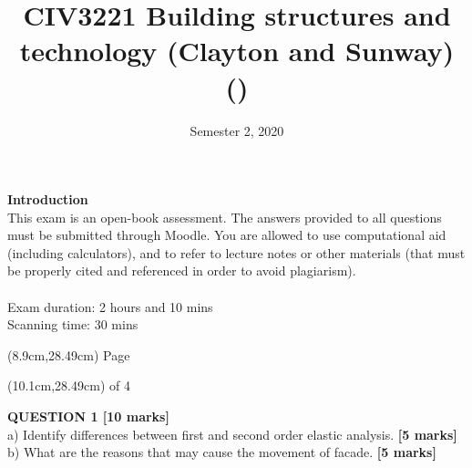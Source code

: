 \documentclass[a4paper,11pt]{article}
\title{CIV3221 Building structures and technology (Clayton and Sunway)\\
\VAR{FullName} (\VAR{StudentID})}
\date{Semester 2, 2020}
\begin{document}
\maketitle

\begin{introduction}	
\noindent
\textbf{Introduction}\\
\noindent
This exam is an open-book assessment. The answers provided to all questions must be submitted through Moodle. You are allowed to use computational aid (including calculators), and to refer to lecture notes or other materials (that must be properly cited and referenced in order to avoid plagiarism).\\
\\ 
\noindent
Exam duration: 2 hours and 10 mins\\
\noindent
Scanning time: 30 mins\\

\end{introduction}
\begin{textblock*}{5cm}(8.9cm,28.49cm)
Page
\end{textblock*}
\begin{textblock*}{5cm}(10.1cm,28.49cm)
of 4
\end{textblock*}
\newpage
\noindent
\textbf{QUESTION 1 [10 marks]}\\
a)	Identify differences between first and second order elastic analysis. \textbf{[5 marks]}\\
b)  What are the reasons that may cause the movement of facade. \textbf{[5 marks]}\\
\\
\end{document}
